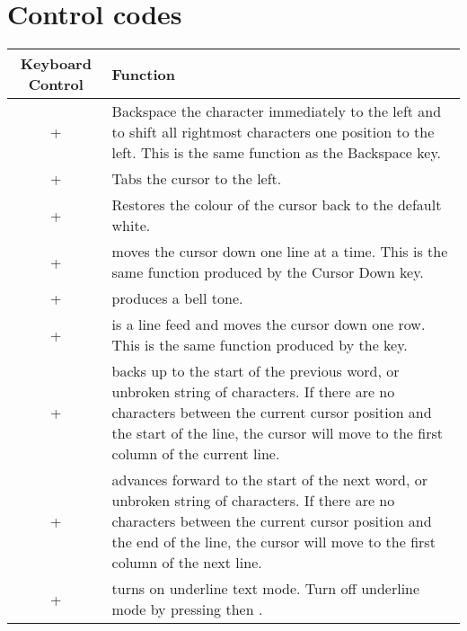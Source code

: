 \newpage



\section{Control codes}
\label{appendix:controlcodes}

\begin{center}
\begin{longtable}{c|L{5.5cm}}
	\textbf{Keyboard Control} & \textbf{Function}\\
   \hline
	\endhead


 +  &
Backspace the character immediately to the left and to shift all rightmost characters one position to the left. This is the same function as the Backspace key.\\

 +  &
Tabs the cursor to the left.\\

 +  &
Restores the colour of the cursor back to the default white.\\

 +  &
moves the cursor down one line at a time. This is the same function produced by the Cursor Down key.\\

 +  &
produces a bell tone.\\

 +  &
is a line feed and moves the cursor down one row. This is the same function produced by the \megakey{$\downarrow$} key.\\

 +  &
backs up to the start of the previous word, or unbroken string of characters. If there are no characters between the current cursor position and the start of the line, the cursor will move to the first column of the current line.\\

 +  &
advances forward to the start of the next word, or unbroken string of characters. If there are no characters between the current cursor position and the end of the line, the cursor will move to the first column of the next line.\\

 +  &
turns on underline text mode. Turn off underline mode by pressing  then .\\


\end{longtable}
\end{center}

